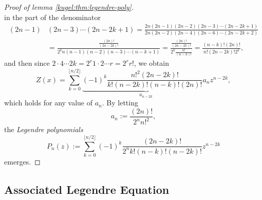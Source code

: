 \begin{proof}[Proof of lemma \ref{kugel:thm:legendre-poly}]
\begin{equation*}
  \end{equation*}
  in the part of the denominator
  \begin{align*}
    (2n-1) & (2n-3) \cdots (2n-2k+1) = \frac{
        2n(2n-1)(2n-2)(2n-3) \cdots (2n-2k+1)
      }{
        2n(2n-2)(2n-4)(2n-6) \cdots (2n-2k+2)
      }
      \\
      &= \frac{
        \frac{(2n)!}{(2n-2k)!}
      }{
        2^k n(n-1)(n-2)(n-3) \cdots (n-k+1)
      }
      = \frac{
        \frac{(2n)!}{(2n-2k)!}
      }{
        2^k \frac{n!}{(n-k)!}
      }
      = \frac{(n-k)!(2n)!}{n!(2n-2k)!2^k},
  \end{align*}
  and then since $2 \cdot 4 \cdots 2k = 2^r 1\cdot2 \cdots r = 2^r r!$, we
  obtain
  \begin{equation*}
    Z(x) = \sum_{k=0}^{\lfloor n / 2\rfloor}
      \underbrace{
        (-1)^k \frac{n!^2(2n-2k)!}{k!(n-2k)!(n-k)!(2n)!} a_n
      }_{a_{n-2k}} z^{n-2k},
  \end{equation*}
  which holds for any value of $a_n$. By letting
  \begin{equation*}
    a_{n} := \frac{(2n)!}{2^n n!^2},
  \end{equation*}
  the \emph{Legendre polynomials}
  \begin{equation}
    P_n(z) := \sum_{k=0}^{\lfloor n/2 \rfloor}
      (-1)^k \frac{(2n-2k)!}{2^n k! (n-k)!(n-2k)!} z^{n-2k} 
  \end{equation}
  emerges.
\end{proof}

\subsection{Associated Legendre Equation}
\label{kugel:sec:proofs:associated-legendre}

